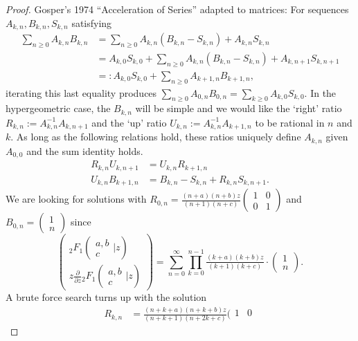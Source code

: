 \documentclass[12pt]{article}
\numberwithin{equation}{section}
\newcommand{\Head}[3] {{}_{#1}{#2}_{#3}}
\newcommand{\ArgS}[3] {( \begin{smallmatrix} #1 \\ #2 \end{smallmatrix} | {#3})}
\begin{document}
\begin{proof}
Gosper's 1974 ``Acceleration of Series'' adapted to matrices: For sequences $A_{k,n}, B_{k,n}, S_{k,n}$ satisfying
\begin{align*}
\sum_{n \ge 0} A_{k,n} B_{k,n} &= \sum_{n \ge 0} A_{k,n} (B_{k,n}-S_{k,n}) + A_{k,n} S_{k,n}\\
&= A_{k,0} S_{k,0} + \sum_{n \ge 0} A_{k,n} (B_{k,n}-S_{k,n}) + A_{k,n+1} S_{k,n+1}\\
&=: A_{k,0} S_{k,0} + \sum_{n \ge 0} A_{k+1,n} B_{k+1,n}\text{,}
\end{align*}
iterating this last equality produces $\sum_{n \ge 0} A_{0,n} B_{0,n} = \sum_{k \ge 0} A_{k,0} S_{k,0}$. In the hypergeometric case, the $B_{k,n}$ will be simple and we would like the `right' ratio $R_{k,n} := A_{k,n}^{-1} A_{k,n+1}$ and the `up' ratio $U_{k,n} := A_{k,n}^{-1} A_{k+1,n}$ to be rational in $n$ and $k$. As long as the following relations hold, these ratios uniquely define $A_{k,n}$ given $A_{0,0}$ and the sum identity holds.
\begin{align*}
R_{k,n} U_{k,n+1} &= U_{k,n} R_{k+1,n}\\
U_{k,n} B_{k+1,n} &= B_{k,n} - S_{k,n} + R_{k,n}S_{k,n+1}\text{.}
\end{align*}
We are looking for solutions with $R_{0,n} = \frac{(n+a)(n+b)z}{(n+1)(n+c)} (\begin{smallmatrix}
1 & 0 \\
0 & 1
\end{smallmatrix})$ and $B_{0,n} = (\begin{smallmatrix}
1 \\
n
\end{smallmatrix})$ since
\begin{equation*}
\begin{pmatrix}
\Head{2}{F}{1} \ArgS{a,b}{c}{z} \\ z \frac{\partial}{\partial z} \Head{2}{F}{1}\ArgS{a,b}{c}{z}
\end{pmatrix}
 = \sum_{n=0}^{\infty}
\prod_{k=0}^{n-1}
\tfrac{(k+a)(k+b)z}{(k+1)(k+c)}
\cdot \left(\begin{smallmatrix}
1 \\
n
\end{smallmatrix}\right)\text{.}
\end{equation*}
A brute force search turns up with the solution
\begin{align*}
R_{k,n} &= \tfrac{(n+k+a)(n+k+b)z}{(n+k+1)(n+2k+c)} (\begin{smallmatrix}
1 & 0 \\

\end{smallmatrix}
\end{align*}
\end{proof}
\end{document}

